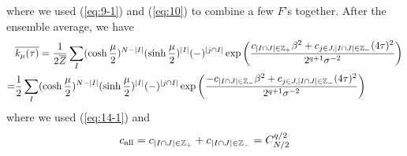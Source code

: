 \documentclass[11pt]{article}
\renewcommand{\>}{\rangle}
\newcommand{\<}{\langle}
\begin{document}
where we used (\ref{eq:9-1}) and (\ref{eq:10}) to combine a few
$F$'s together. After the ensemble average, we have 
\begin{align}
&\overline{k_{\mu}(\tau)}  =\frac{1}{2\overline{Z}}\sum_{I}(\cosh\frac{\mu}{2})^{N-|I|}(\sinh\frac{\mu}{2})^{|I|}(-)^{|j\cap I|}\exp\left(\frac{c_{|I\cap J|\in\mathbb{Z}_{+}}\beta^{2}+c_{j\in J,|I\cap J|\in\mathbb{Z}_{-}}(4\tau)^{2}}{2^{q+1}\sigma^{-2}}\right)\nonumber \\
 =& \frac{1}{2}\sum_{I}(\cosh\frac{\mu}{2})^{N-|I|}(\sinh\frac{\mu}{2})^{|I|}(-)^{|j\cap I|}\exp\left(\frac{-c_{|I\cap J|\in\mathbb{Z}_{-}}\beta^{2}+c_{j\in J,|I\cap J|\in\mathbb{Z}_{-}}(4\tau)^{2}}{2^{q+1}\sigma^{-2}}\right)\label{eq:40-1-1}
\end{align}
where we used (\ref{eq:14-1}) and
\begin{equation}
c_{\text{all}}=c_{|I\cap J|\in\mathbb{Z}_{+}}+c_{|I\cap J|\in\mathbb{Z}_{-}}=C_{N/2}^{q/2}
\end{equation}
\end{document}
